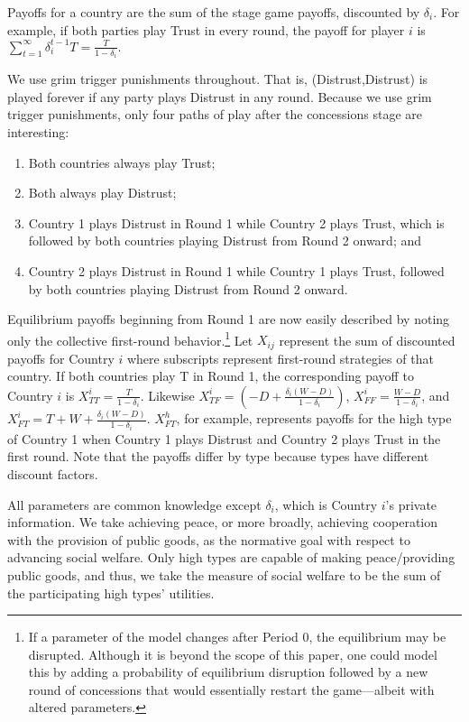 \documentclass[bibtex,autowc]{apsr_submission}
\newcommand{\de}{\delta}
\begin{document}
Payoffs for a country are the sum of the stage game payoffs, discounted by $\delta_i$. For example, if both parties play Trust in every round, the payoff for player $i$ is $\sum_{t=1}^\infty \de_i^{t-1} T = \frac{T}{1-\de_i}.$

We use grim trigger punishments throughout. That is, (Distrust,Distrust) is played forever if any party plays Distrust in any round. Because we use grim trigger punishments, only four paths of play after the concessions stage are interesting:
\raggedbottom
\begin{enumerate}
    \item Both countries always play Trust; 
    \item Both always play Distrust; 
    \item Country 1 plays Distrust in Round 1 while Country 2 plays Trust, which is followed by both countries playing Distrust from Round 2 onward; and 
    \item Country 2 plays Distrust in Round 1 while Country 1 plays Trust, followed by both countries playing Distrust from Round 2 onward.
\end{enumerate}
\raggedbottom
Equilibrium payoffs beginning from Round 1 are now easily described by noting only the collective first-round behavior.\footnote{If a parameter of the model changes after Period 0, the equilibrium may be disrupted. Although it is beyond the scope of this paper, one could model this by adding a probability of equilibrium disruption followed by a new round of concessions that would essentially restart the game---albeit with altered parameters.} Let $X_{ij}$ represent the sum of discounted payoffs for Country $i$ where subscripts represent first-round strategies of that country. If both countries play T in Round 1, the corresponding payoff to Country $i$ is $ X_{TT}^i=\frac {T}{1- \delta_i}$. Likewise $X_{TF}^i=({-D}+\frac{\delta_i(W-D)}{1- \delta_i} )$, $ X_{FF}^i=\frac{W-D}{1- \delta_i}$, and  $X_{FT}^i=T+W +\frac{\delta_i(W-D)}{1- \delta_i}$. $X_{FT}^h$, for example, represents payoffs for the high type of Country 1 when Country 1 plays Distrust and Country 2 plays Trust in the first round. Note that the payoffs differ by type because types have different discount factors.

All parameters are common knowledge except $\delta_i$, which is Country $i$'s private information. We take achieving peace, or more broadly, achieving cooperation with the provision of public goods, as the normative goal with respect to advancing social welfare. Only high types are capable of making peace/providing public goods, and thus, we take the measure of social welfare to be the sum of the participating high types’ utilities.
\end{document}
